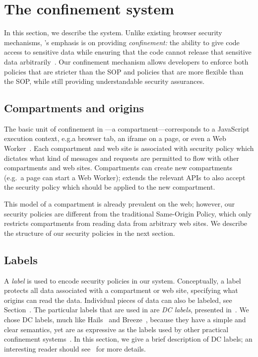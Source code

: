 \section{The \sys{} confinement system}
\label{sec:system}

In this section, we describe the \sys{} system.
%
Unlike existing browser security mechanisms, \sys{}'s emphasis
is on providing \emph{confinement:} the ability to give code access to sensitive
data while ensuring that the code cannot release that sensitive
data arbitrarily~\cite{SaltzerS75}.
%
Our confinement mechanism allows developers to enforce both policies
that are stricter than the SOP and policies that are more flexible
than the SOP, while still providing understandable security assurances.

\subsection{Compartments and origins}

The basic unit of confinement in \sys{}---a compartment---corresponds to
a JavaScript execution context, e.g.\@ a browser tab, an iframe on a
page, or even a Web Worker~\cite{workers}.
%
Each compartment and web site is associated with security policy which
dictates what kind of messages and requests are permitted to flow with
other compartments and web sites.
%
Compartments can create new compartments (e.g.\ a page can start a Web
Worker); \sys{} extends the relevant APIs to also accept the security
policy which should be applied to the new compartment.

This model of a compartment is already prevalent on the web; however,
our security policies are different from the traditional Same-Origin
Policy, which only restricts compartments from reading data from
arbitrary web sites.
%
We describe the structure of our security policies in the next section.

\subsection{Labels}

A \emph{label} is used to encode security policies in our system.
%
Conceptually, a label protects all data associated with a compartment or
web site, specifying what origins can read the data.
%
Individual pieces of data can also be labeled, see Section~.
%
The particular labels that are used in \sys{} are \emph{DC labels},
presented in~\cite{stefan:2011:dclabels}.
%
We chose DC labels, much like Hails~\cite{giffin:2012:hails} and
Breeze~\cite{Breeze13}, because they have a simple and clear
semantics, yet are as expressive as the labels used by other practical
confinement systems~\cite{GenLabels}.
%
In this section, we give a brief description of DC labels; an interesting
reader should see~\cite{stefan:2011:dclabels} for more details.

